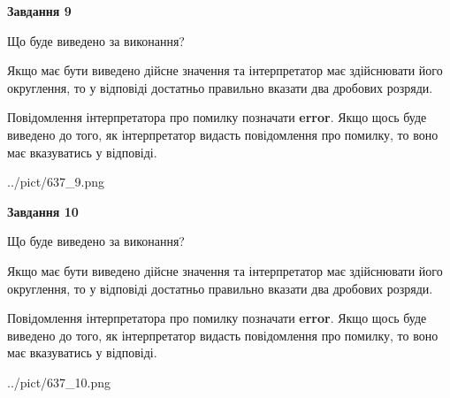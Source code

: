 \documentclass[12pt, ukrainian]{article}
\begin{document}
{\begin {Large}
{\begin {center}\textbf{Завдання 9}\end {center}}\par
Що буде виведено за виконання? \par

Якщо має бути виведено дійсне значення та інтерпретатор має здійснювати його округлення, 
то у відповіді достатньо правильно вказати два дробових розряди.

Повідомлення інтерпретатора про помилку позначати \textbf{error}.
Якщо щось буде виведено до того, як інтерпретатор видасть повідомлення про помилку, 
то воно має вказуватись у відповіді. \par

\begin{center}
	{../pict/637_9.png}
\end{center}
\newpage

{\begin {center}\textbf{Завдання 10}\end {center}}\par
Що буде виведено за виконання? \par

Якщо має бути виведено дійсне значення та інтерпретатор має здійснювати його округлення, 
то у відповіді достатньо правильно вказати два дробових розряди.

Повідомлення інтерпретатора про помилку позначати \textbf{error}.
Якщо щось буде виведено до того, як інтерпретатор видасть повідомлення про помилку, 
то воно має вказуватись у відповіді. \par

\begin{center}
	{../pict/637_10.png}
\end{center}
\newpage

\end {Large}}
\end{document}
